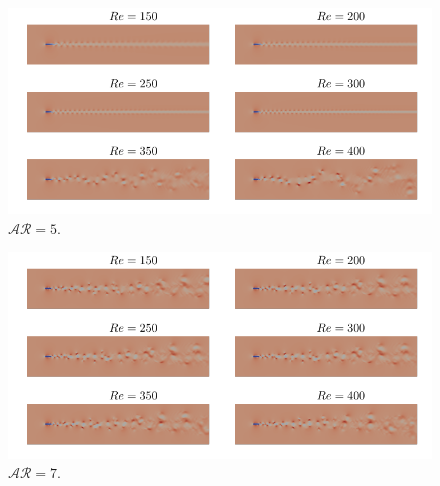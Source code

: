 \documentclass[onecolumn,notitlepage,superscriptaddress, amsmath,amssymb,longbibliographyaps,floatfix]{revtex4-1}
\begin{document}
\begin{figure}
  \centering
  \includegraphics[width=\textwidth]{./fig/AR5.pdf}
  \caption{$\mathcal{AR}=5$.}
  \label{fig:AR5}
\end{figure}

\begin{figure}
  \centering
  \includegraphics[width=\textwidth]{./fig/AR7.pdf}
  \caption{$\mathcal{AR}=7$.}
  \label{fig:AR7}
\end{figure}



	
	
\end{document}

